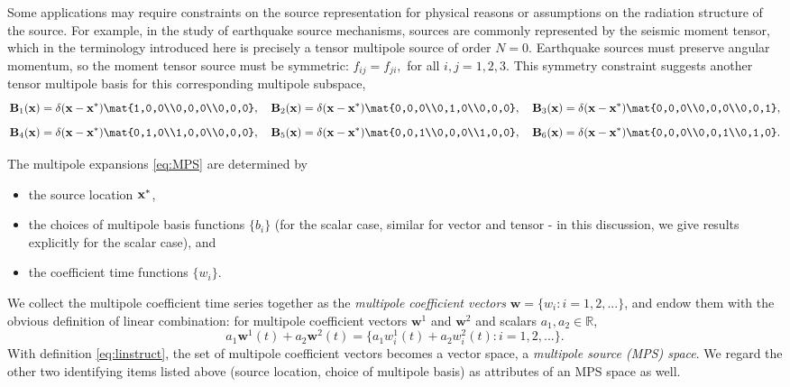 Some applications may require constraints on the source representation for physical reasons or assumptions on the radiation structure of the source. 
For example, in the study of earthquake source mechanisms, sources are commonly represented by the seismic moment tensor, which in the terminology introduced here is precisely a tensor multipole source of order $N=0$.  
Earthquake sources must preserve angular momentum, so the moment tensor source must be symmetric: $f_{ij} = f_{ji},$ for all $i,j=1,2,3$.
This symmetry constraint suggests another tensor multipole basis for this corresponding multipole subspace,
\[
        \mathbf B_1(\mathbf x) = \delta(\mathbf x -\mathbf x^*) \mat{1,0,0\\0,0,0\\0,0,0}, \quad
        \mathbf B_2(\mathbf x) = \delta(\mathbf x -\mathbf x^*) \mat{0,0,0\\0,1,0\\0,0,0}, \quad
        \mathbf B_3(\mathbf x) = \delta(\mathbf x -\mathbf x^*) \mat{0,0,0\\0,0,0\\0,0,1},
\]
\[
        \mathbf B_4(\mathbf x) = \delta(\mathbf x -\mathbf x^*) \mat{0,1,0\\1,0,0\\0,0,0}, \quad
        \mathbf B_5(\mathbf x) = \delta(\mathbf x -\mathbf x^*) \mat{0,0,1\\0,0,0\\1,0,0}, \quad
        \mathbf B_6(\mathbf x) = \delta(\mathbf x -\mathbf x^*) \mat{0,0,0\\0,0,1\\0,1,0}.
\]

The multipole expansions \ref{eq:MPS} are determined by 
\begin{itemize}
	\item the source location ${\bf x}^*$,
	\item the choices of multipole basis functions $\{b_i\}$ 
		(for the scalar case, similar for vector and tensor - in this discussion, we give results explicitly for the scalar case), and
	\item the coefficient time functions $\{w_i\}$.
\end{itemize}
We collect the multipole coefficient time series together as the {\em multipole coefficient vectors} $\mathbf w = \{w_i: i=1,2,...\}$, and endow them with the obvious definition of linear combination: 
for multipole coefficient vectors $\mathbf w^{1}$ and $\mathbf w^{2}$ and scalars $a_1, a_2\in\mathbb R$, 
\begin{equation} \label{eq:linstruct}
	a_1 \mathbf w^{1}(t) + a_2 \mathbf w^{2}(t) 
	= \{a_1 w_{i}^{1}(t) + a_2  w_{i}^{2}(t) : i=1,2,...\}.
\end{equation}
With definition \ref{eq:linstruct}, the set of multipole coefficient vectors becomes a vector space, a {\em multipole source (MPS) space}. 
We regard the other two identifying items listed above (source location, choice of multipole basis) as attributes of an MPS space as well.

